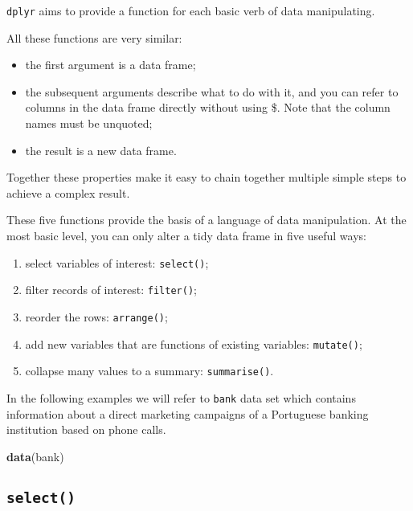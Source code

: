 \documentclass[]{book}
\newenvironment{Shaded}{\begin{snugshade}}{\end{snugshade}}
\newcommand{\KeywordTok}[1]{\textcolor[rgb]{0.13,0.29,0.53}{\textbf{{#1}}}}
\newcommand{\NormalTok}[1]{{#1}}
\providecommand{\tightlist}{%
  \setlength{\itemsep}{0pt}\setlength{\parskip}{0pt}}
\def\tightlist{}
\begin{document}
\texttt{dplyr} aims to provide a function for each basic verb of data
manipulating.

All these functions are very similar:

\begin{itemize}
\tightlist
\item
  the first argument is a data frame;
\item
  the subsequent arguments describe what to do with it, and you can
  refer to columns in the data frame directly without using \$. Note
  that the column names must be unquoted;
\item
  the result is a new data frame.
\end{itemize}

Together these properties make it easy to chain together multiple simple
steps to achieve a complex result.

These five functions provide the basis of a language of data
manipulation. At the most basic level, you can only alter a tidy data
frame in five useful ways:

\begin{enumerate}
\def\labelenumi{\arabic{enumi}.}
\tightlist
\item
  select variables of interest: \texttt{select()};
\item
  filter records of interest: \texttt{filter()};
\item
  reorder the rows: \texttt{arrange()};
\item
  add new variables that are functions of existing variables:
  \texttt{mutate()};
\item
  collapse many values to a summary: \texttt{summarise()}.
\end{enumerate}

In the following examples we will refer to \texttt{bank} data set which
contains information about a direct marketing campaigns of a Portuguese
banking institution based on phone calls.

\begin{Shaded}
\begin{Highlighting}[]
\KeywordTok{data}\NormalTok{(bank) }
\end{Highlighting}
\end{Shaded}

\subsection{\texorpdfstring{\texttt{select()}}{select()}}\label{select}
\end{document}
